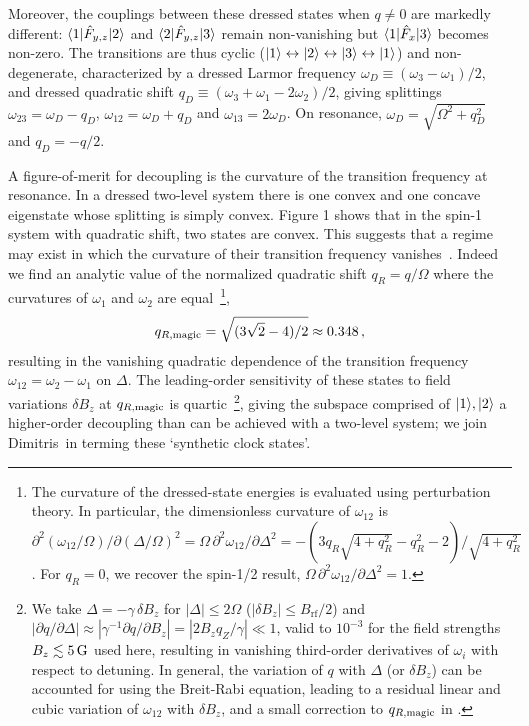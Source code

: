 \documentclass[aps,prl,reprint,superscriptaddress,floatfix]{revtex4-1}
\begin{document}
Moreover, the couplings between these dressed states when $q \neq 0$ are markedly different:
$\langle 1 \vert  \hat{F}_{y,z} \vert 2 \rangle $ and $\langle 2 \vert  \hat{F}_{y,z} \vert 3 \rangle $ remain non-vanishing but $\langle 1 \vert  \hat{F}_x \vert 3 \rangle $ becomes non-zero.
The transitions are thus cyclic ($\vert 1 \rangle  \leftrightarrow \vert 2 \rangle  \leftrightarrow \vert 3 \rangle  \leftrightarrow \vert 1 \rangle $) and non-degenerate, characterized by a dressed Larmor frequency $\omega_D\equiv(\omega_3-\omega_1)/2$, and dressed quadratic shift $q_D \equiv (\omega_3 + \omega_1 -2\omega_2)/2$, giving splittings $\omega_{23}=\omega_D-q_D$, $\omega_{12}=\omega_D+q_D$ and $\omega_{13}=2\omega_D$.
On resonance, $\omega_D=\sqrt{\Omega^2+q_D^2}$ and $q_D = -q/2$.

A figure-of-merit for decoupling is the curvature of the transition frequency at resonance.
In a dressed two-level system there is one convex and one concave eigenstate whose splitting is simply convex.
Figure 1 shows that in the spin-1 system with quadratic shift, two states are convex.
This suggests that a regime may exist in which the curvature of their transition frequency vanishes~\cite{rabl_strong_2009,*xu_coherence-protected_2012}.
Indeed we find an analytic value of the normalized quadratic shift $q_R=q/\Omega$ where the curvatures of $\omega_1$ and $\omega_2$ are equal~\footnote{
  The curvature of the dressed-state energies is evaluated using perturbation theory. In particular, the dimensionless curvature of $\omega_{12}$ is $\partial^2(\omega_{12}/\Omega)/\partial(\Delta/\Omega)^2 = \Omega \, \partial^2\omega_{12}/\partial \Delta^2 = -(3 q_R \sqrt{4 + q_R^2} - q_R^2 - 2)/\sqrt{4 + q_R^2}$. For $q_R = 0$, we recover the spin-1/2 result, $\Omega\, \partial^2\omega_{12}/\partial \Delta^2 = 1$.},
\begin{align}
\label{eq:qRmagic}
    q_{R,\text{magic}} = \sqrt{(3\sqrt{2} - 4)/2} \approx 0.348 \, ,
\end{align}
resulting in the vanishing quadratic dependence of the transition frequency $\omega_{12}=\omega_2 - \omega_1$ on $\Delta$.
The leading-order sensitivity of these states to field variations $\delta B_z$ at $q_{R,\text{magic}}$ is quartic~\footnote{
    We take $\Delta = -\gamma \, \delta B_z$ for $|\Delta | \leq 2\Omega$ ($| \delta B_z | \leq B_{\text{rf}}/2$) and $| \partial q / \partial \Delta | \approx | \gamma^{-1} \partial q / \partial B_z | = |2 B_z q_Z / \gamma| \ll 1$, valid to $10^{-3}$ for the field strengths $B_z \lesssim \unit[5]{G}$ used here, resulting in vanishing third-order derivatives of $\omega_i$ with respect to detuning. 
    In general, the variation of $q$ with $\Delta$ (or $\delta B_z$) can be accounted for using the Breit-Rabi equation, leading to a residual linear and cubic variation of $\omega_{12}$ with $\delta B_z$, and a small correction to $q_{R,\text{magic}}$ in .},
giving the subspace comprised of ${\vert 1 \rangle ,\vert 2 \rangle }$ a higher-order decoupling than can be achieved with a two-level system; we join Dimitris~\etal in terming these `synthetic clock states'.
\end{document}
